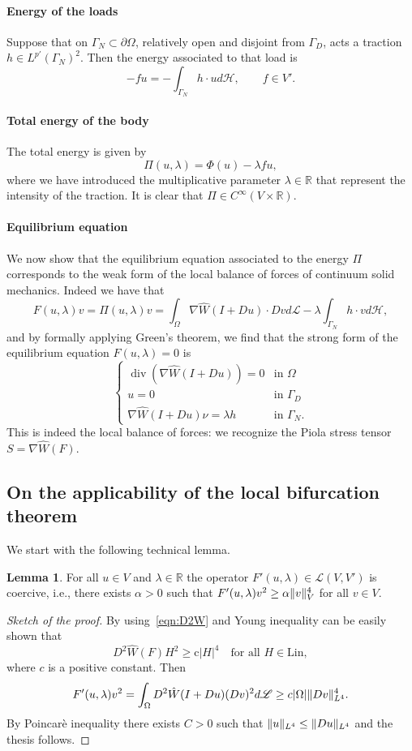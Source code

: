 \documentclass[a4paper,11pt]{article}
\theoremstyle{definition}
\newtheorem{lemma}[prop]{Lemma}
\DeclareMathOperator{\diver}{div}
\DeclarePairedDelimiter{\norm}{\lVert}{\rVert}
\begin{document}
\paragraph{Energy of the loads} Suppose that on $\Gamma_N\subset\partial\Omega$, relatively open and disjoint from $\Gamma_D$, acts a traction $h\in L^{p'}(\Gamma_N)^2$. Then the energy associated to that load is
\[
-fu=-\int_{\Gamma_N}h\cdot ud\mathscr{H},\qquad\text{$f\in V'$}.
\]

\paragraph{Total energy of the body} The total energy is given by
\[
\Pi(u,\lambda)=\Phi(u)-\lambda fu,
\]
where we have introduced the multiplicative parameter $\lambda\in\mathbb{R}$ that represent the intensity of the traction. It is clear that $\Pi\in C^\infty(V\times\mathbb{R})$.

\paragraph{Equilibrium equation} We now show that the equilibrium equation associated to the energy $\Pi$ corresponds to the weak form of the local balance of forces of continuum solid mechanics. Indeed we have that
\[
F(u,\lambda)v=\Pi(u,\lambda)v=\int_\Omega \nabla\hat{W}(I+Du)\cdot Dvd\mathscr{L}-\lambda\int_{\Gamma_N}h\cdot vd\mathscr{H},
\]
and by formally applying Green's theorem, we find that the strong form of the equilibrium equation $F(u,\lambda)=0$ is
\[
\begin{cases}
\diver(\nabla \hat W(I+Du))=0 & \text{in $\Omega$} \\
u=0 & \text{in $\Gamma_D$} \\
\nabla \hat W(I+Du)\nu=\lambda h & \text{in $\Gamma_N$}.
\end{cases}
\]
This is indeed the local balance of forces: we recognize the Piola stress tensor $S=\nabla \hat{W}(F)$.

\subsection{On the applicability of the local bifurcation theorem}

We start with the following technical lemma.
\begin{lemma}
For all $u\in V$ and $\lambda\in\mathbb{R}$ the operator $F'(u,\lambda)\in\mathscr{L}(V,V')$ is coercive, i.e., there exists $\alpha>0$ such that $F'(u,\lambda)v^2\ge\alpha\norm{v}_V^4$ for all $v\in V$.
\end{lemma}
\begin{proof}[Sketch of the proof]
By using~\eqref{eqn:D2W} and Young inequality can be easily shown that
\[
D^2\hat W(F)H^2\ge\text{c}|H|^4\quad\text{for all $H\in\text{Lin}$},
\]
where $c$ is a positive constant. Then
\[
F'(u,\lambda)v^2=\int_\Omega D^2\hat{W}(I+Du)(Dv)^2d\mathscr{L}\ge c|\Omega|\norm{Dv}_{L^4}^4.
\]
By Poincarè inequality there exists $C>0$ such that $\norm{u}_{L^4}\le\norm{Du}_{L^4}$ and the thesis follows.
\end{proof}
\end{document}
